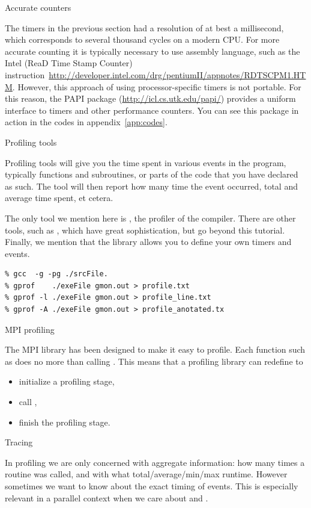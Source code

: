  {Accurate counters}

The timers in the previous section had a resolution of at best a
millisecond, which corresponds to several thousand cycles on a modern
CPU. For more accurate counting it is typically necessary to use
assembly language, such as the Intel  (ReaD Time Stamp
Counter)
instruction~\url{http://developer.intel.com/drg/pentiumII/appnotes/RDTSCPM1.HTM}. However,
this approach of using processor-specific timers is not portable. For
this reason, the PAPI package (\url{http://icl.cs.utk.edu/papi/})
provides a uniform interface to timers and other performance
counters. You can see this package in action in the codes in
appendix~\ref{app:codes}.

 {Profiling tools}

Profiling tools will give you the time spent in various events in the
program, typically functions and subroutines, or parts of the code
that you have declared as such. The tool will then report how many
time the event occurred, total and average time spent, et cetera.

The only tool we mention here is , the profiler of
the  compiler. There are other tools, such as
, which have great sophistication, but go beyond this
tutorial. Finally, we mention that the  library
allows you to define your own timers and events.

\begin{verbatim}
% gcc  -g -pg ./srcFile.
% gprof    ./exeFile gmon.out > profile.txt
% gprof -l ./exeFile gmon.out > profile_line.txt
% gprof -A ./exeFile gmon.out > profile_anotated.tx
\end{verbatim}

 {MPI profiling}

The MPI library has been designed to make it easy to profile. Each
function such as  does no more than calling
. This means that a profiling library can redefine
 to
\begin{itemize}
\item initialize a profiling stage,\item call , \item
  finish the profiling stage.
\end{itemize}

 {Tracing}

In profiling we are only concerned with aggregate information: how
many times a routine was called, and with what total/average/min/max
runtime. However sometimes we want to know about the exact timing of
events. This is especially relevant in a parallel context when we care
about  and .

